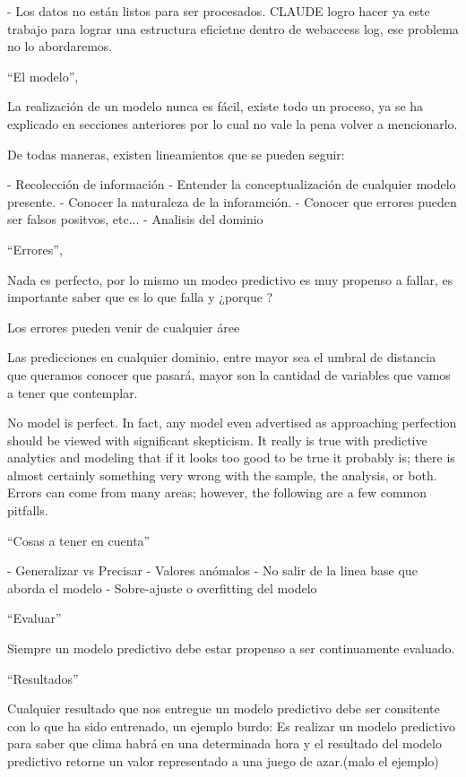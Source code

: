 - Los datos no están listos para ser procesados. CLAUDE logro hacer ya este trabajo para lograr una estructura eficietne dentro de webaccess log, ese problema no lo abordaremos.





``El modelo'', 

La realización de un modelo nunca es fácil, existe todo un proceso, ya se ha explicado en secciones anteriores por lo cual no vale la pena volver a mencionarlo.

De todas maneras, existen lineamientos que se pueden seguir:

- Recolección de información
- Entender la conceptualización de cualquier modelo presente.
- Conocer la naturaleza de la inforamción.
- Conocer que errores pueden ser falsos positvos, etc...
- Analisis del dominio 



``Errores'',

Nada es perfecto, por lo mismo un modeo predictivo es muy propenso a fallar, es importante saber que es lo que falla y ¿porque ?

Los errores pueden venir de cualquier áree

Las predicciones en cualquier dominio, entre mayor sea el umbral de distancia que queramos conocer que pasará, mayor son la cantidad de variables que vamos a tener que contemplar.



No model is perfect. In fact, any model even advertised as approaching perfection should be viewed with significant skepticism. It really is true with predictive analytics and modeling that if it looks too good to be true it probably is; there is almost certainly something very wrong with the sample, the analysis, or both. Errors can come from many areas; however, the following are a few common pitfalls.


``Cosas a tener en cuenta'' 

- Generalizar vs Precisar
- Valores anómalos
- No salir de la linea base que aborda el modelo
- Sobre-ajuste o overfitting del modelo




``Evaluar''

Siempre un modelo predictivo debe estar propenso a ser continuamente evaluado.




``Resultados''

Cualquier resultado que nos entregue un modelo predictivo debe ser consitente con lo que ha sido entrenado, un ejemplo burdo:  Es realizar un modelo predictivo para saber que clima habrá en una determinada hora y el resultado del modelo predictivo retorne un valor representado a una juego de azar.(malo el ejemplo)

